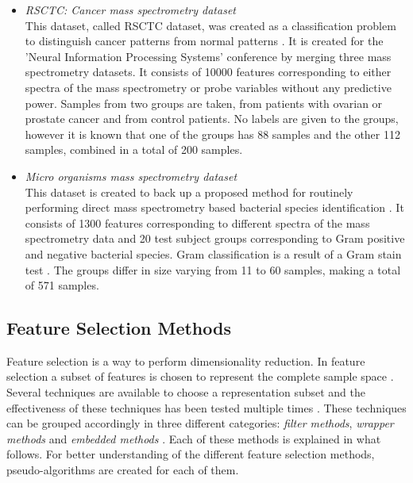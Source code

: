 \documentclass[10pt,a4paper]{report}
\begin{document}
	\begin{itemize}
		\item \textit{RSCTC: Cancer mass spectrometry dataset} \\ This dataset, called RSCTC dataset, was created as a classification problem to distinguish cancer patterns from normal patterns \cite{NIPS2004_2728}. It is created for the 'Neural Information Processing Systems' conference by merging three mass spectrometry datasets. It consists of 10000 features corresponding to either spectra of the mass spectrometry or probe variables without any predictive power. Samples from two groups are taken, from patients with ovarian or prostate cancer and from control patients. No labels are given to the groups, however it is known that one of the groups has 88 samples and the other 112 samples, combined in a total of 200 samples.
		\item \textit{Micro organisms mass spectrometry dataset} \\ This dataset is created to back up a proposed method for routinely performing direct mass spectrometry based bacterial species identification \cite{doi:10.1093/bioinformatics/btu022}. It consists of 1300 features corresponding to different spectra of the mass spectrometry data and 20 test subject groups corresponding to Gram positive and negative bacterial species. Gram classification is a result of a Gram stain test \cite{madigan2017brock}. The groups differ in size varying from 11 to 60 samples, making a total of 571 samples.
	\end{itemize}
	
	\subsection{Feature Selection Methods}
	\label{FSsubsec:FeatureSelectionMethods}
	
	Feature selection is a way to perform dimensionality reduction. In feature selection a subset of features is chosen to represent the complete sample space \cite{Guyon2006}. Several techniques are available to choose a representation subset and the effectiveness of these techniques has been tested multiple times \cite{CATAL20091040, molina2002feature}. These techniques can be grouped accordingly in three different categories: \textit{filter methods}, \textit{wrapper methods} and \textit{embedded methods} \cite{saeys2007review}. Each of these methods is explained in what follows. For better understanding of the different feature selection methods, pseudo-algorithms are created for each of them.
\end{document}
